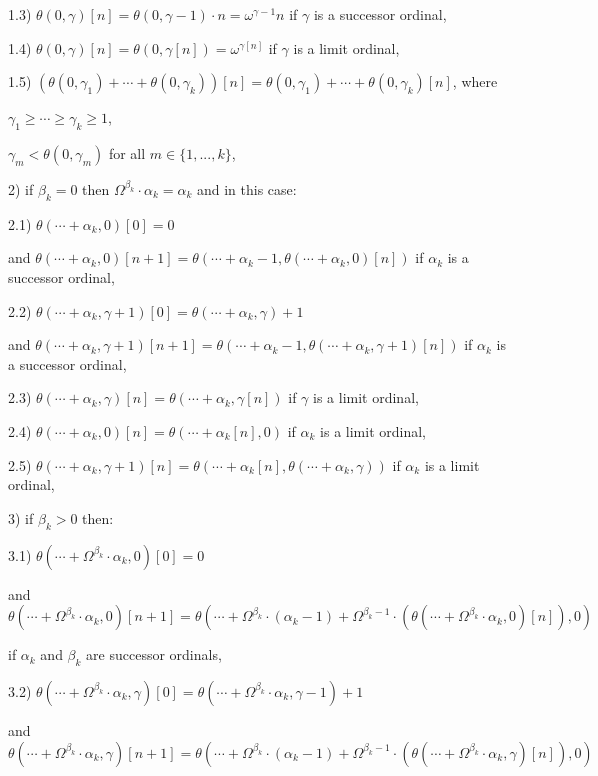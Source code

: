 \documentclass[10pt]{article}
\begin{document}
1.3) \(\theta(0,\gamma)[n]=\theta(0,\gamma-1)\cdot n=\omega^{\gamma-1} n\) if \(\gamma\) is a successor ordinal,

1.4) \(\theta(0,\gamma)[n]=\theta(0,\gamma[n])=\omega^{\gamma[n]} \) if \(\gamma\) is a limit ordinal,

1.5) \((\theta(0,\gamma_1)+\cdots+\theta(0,\gamma_k))[n]=\theta(0,\gamma_1)+\cdots+\theta(0,\gamma_k)[n]\), where

\(\gamma_1 \geq \cdots \geq \gamma_k \geq 1\),

\(\gamma_m<\theta(0,\gamma_m)\) for all \(m \in \{1,...,k\}\),

2) if \(\beta_k=0\) then \(\Omega^{\beta_k} \cdot \alpha_k=\alpha_k\) and in this case:

2.1) \(\theta(\cdots+\alpha_k,0)[0]=0\)

and \(\theta(\cdots+\alpha_k,0)[n+1]=\theta(\cdots+\alpha_k-1,\theta(\cdots+\alpha_k,0)[n])\) if \(\alpha_k\) is a successor ordinal,

2.2) \(\theta(\cdots+\alpha_k,\gamma+1)[0]=\theta(\cdots+\alpha_k,\gamma)+1\)

and \(\theta(\cdots+\alpha_k,\gamma+1)[n+1]=\theta(\cdots+\alpha_k-1,\theta(\cdots+\alpha_k,\gamma+1)[n])\) if \(\alpha_k\) is a successor ordinal,

2.3) \(\theta(\cdots+\alpha_k,\gamma)[n]=\theta(\cdots+\alpha_k,\gamma[n])\) if \(\gamma\) is a limit ordinal,

2.4) \(\theta(\cdots+\alpha_k,0)[n]=\theta(\cdots+\alpha_k[n],0)\) if \(\alpha_k\) is a limit ordinal,

2.5) \(\theta(\cdots+\alpha_k,\gamma+1)[n]=\theta(\cdots+\alpha_k[n],\theta(\cdots+\alpha_k,\gamma))\) if \(\alpha_k\) is a limit ordinal,

3) if \(\beta_k > 0\) then:

3.1) \(\theta(\cdots+\Omega^{\beta_k}\cdot\alpha_k,0)[0]=0\)

and \(\theta(\cdots+\Omega^{\beta_k}\cdot\alpha_k,0)[n+1]=\theta(\cdots+\Omega^{\beta_k}\cdot(\alpha_k-1)+\Omega^{\beta_k-1}\cdot(\theta(\cdots+\Omega^{\beta_k}\cdot\alpha_k,0)[n]),0)\)

if \(\alpha_k\) and \(\beta_k\) are successor ordinals,

3.2) \(\theta(\cdots+\Omega^{\beta_k}\cdot\alpha_k,\gamma)[0]=\theta(\cdots+\Omega^{\beta_k}\cdot\alpha_k,\gamma-1)+1\)

and \(\theta(\cdots+\Omega^{\beta_k}\cdot\alpha_k,\gamma)[n+1]=\theta(\cdots+\Omega^{\beta_k}\cdot(\alpha_k-1)+\Omega^{\beta_k-1}\cdot(\theta(\cdots+\Omega^{\beta_k}\cdot\alpha_k,\gamma)[n]),0)\)
\end{document}
